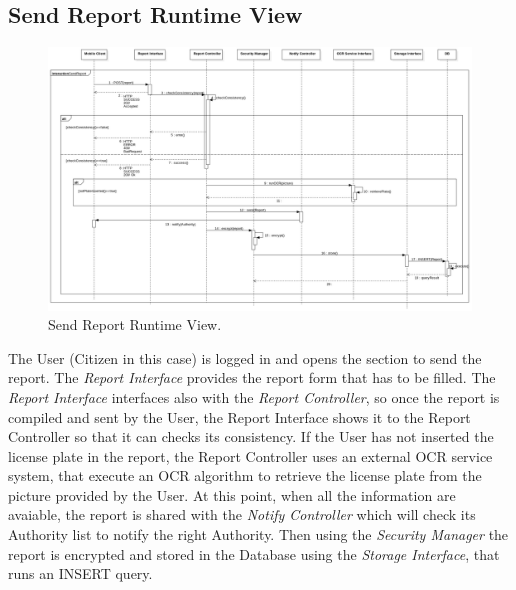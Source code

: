 \documentclass{report}
\begin{document}
\subsection{Send Report Runtime View}
\begin{figure}[!ht]
	\begin{center}
	\includegraphics[width=\textwidth]{img/SendReport.png}
    \end{center}
    \label{fig:SendReportSD}
	\caption{Send Report Runtime View.}
\end{figure}
The User (Citizen in this case) is logged in and opens the section to send the report. The \textit{Report Interface} provides the report form that has to be filled. The \textit{Report Interface} interfaces also with the \textit{Report Controller}, so once the report is compiled and sent by the User, the Report Interface shows it to the Report Controller so that it can checks its consistency. 
If the User has not inserted the license plate in the report, the Report Controller uses an external OCR service system, that execute an OCR algorithm to retrieve the license plate from the picture provided by the User.
At this point, when all the information are avaiable, the report is shared with the \textit{Notify Controller} which will check its Authority list to notify the right Authority.
Then using the \textit{Security Manager} the report is encrypted and stored in the Database using the \textit{Storage Interface}, that runs an INSERT query. 
\newpage
\end{document}
